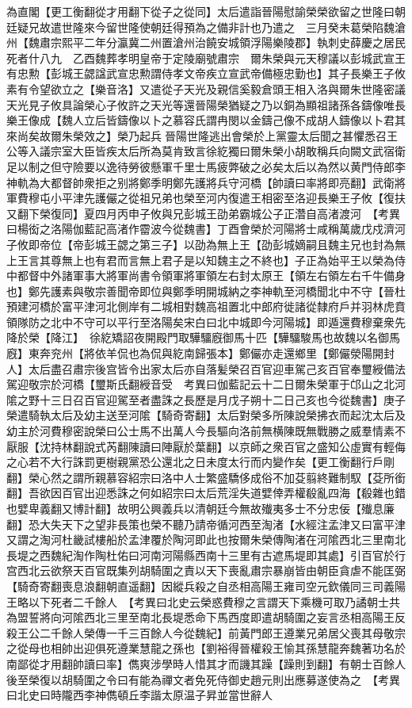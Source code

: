為直閣【更工衡翻從才用翻下從子之從同】太后遣詣晉陽慰諭榮榮欲留之世隆曰朝廷疑兄故遣世隆來今留世隆使朝廷得預為之備非計也乃遣之　三月癸未葛榮陷魏滄州【魏肅宗熙平二年分瀛冀二州置滄州治饒安城領浮陽樂陵郡】執刺史薛慶之居民死者什八九　乙酉魏葬孝明皇帝于定陵廟號肅宗　爾朱榮與元天穆議以彭城武宣王有忠勲【彭城王勰諡武宣忠勲謂侍孝文帝疾立宣武帝備極忠勤也】其子長樂王子攸素有令望欲立之【樂音洛】又遣從子天光及親信奚毅倉頭王相入洛與爾朱世隆密議天光見子攸具論榮心子攸許之天光等還晉陽榮猶疑之乃以銅為顯祖諸孫各鑄像唯長樂王像成【魏人立后皆鑄像以卜之慕容氏謂冉閔以金鑄己像不成胡人鑄像以卜君其來尚矣故爾朱榮效之】榮乃起兵晉陽世隆逃出會榮於上黨靈太后聞之甚懼悉召王公等入議宗室大臣皆疾太后所為莫肯致言徐紇獨曰爾朱榮小胡敢稱兵向闕文武宿衛足以制之但守險要以逸待勞彼懸軍千里士馬疲弊破之必矣太后以為然以黄門侍郎李神軌為大都督帥衆拒之别將鄭季明鄭先護將兵守河橋【帥讀曰率將即亮翻】武衛將軍費穆屯小平津先護儼之從祖兄弟也榮至河内復遣王相密至洛迎長樂王子攸【復扶又翻下榮復同】夏四月丙申子攸與兄彭城王劭弟霸城公子正濳自高渚渡河　【考異曰楊衒之洛陽伽藍記高渚作霤波今從魏書】丁酉會榮於河陽將士咸稱萬歲戊戍濟河子攸即帝位【帝彭城王勰之第三子】以劭為無上王【劭彭城嫡嗣且魏主兄也封為無上王言其尊無上也有君而言無上君子是以知魏主之不終也】子正為始平王以榮為侍中都督中外諸軍事大將軍尚書令領軍將軍領左右封太原王【領左右領左右千牛備身也】鄭先護素與敬宗善聞帝即位與鄭季明開城納之李神軌至河橋聞北中不守【晉杜預建河橋於富平津河北側岸有二城相對魏高祖置北中郎府徙諸從隸府戶并羽林虎賁領隊防之北中不守可以平行至洛陽矣宋白曰北中城即今河陽城】即遁還費穆棄衆先降於榮【降江】　徐紇矯詔夜開殿門取驊驑廐御馬十匹【驊驑駿馬也故魏以名御馬廐】東奔兖州【將依羊侃也為侃與紇南歸張本】鄭儼亦走還鄉里【鄭儼滎陽開封人】太后盡召肅宗後宫皆令出家太后亦自落髪榮召百官迎車駕己亥百官奉璽綬備法駕迎敬宗於河橋【璽斯氏翻綬音受　考異曰伽藍記云十二日爾朱榮軍于邙山之北河隂之野十三日召百官迎駕至者盡誅之長歷是月戊子朔十二日己亥也今從魏書】庚子榮遣騎執太后及幼主送至河隂【騎奇寄翻】太后對榮多所陳說榮拂衣而起沈太后及幼主於河費穆密說榮曰公士馬不出萬人今長驅向洛前無横陳既無戰勝之威羣情素不厭服【沈持林翻說式芮翻陳讀曰陣厭於葉翻】以京師之衆百官之盛知公虛實有輕侮之心若不大行誅罰更樹親黨恐公還北之日未度太行而内變作矣【更工衡翻行戶剛翻】榮心然之謂所親慕容紹宗曰洛中人士繁盛驕侈成俗不加芟翦終難制馭【芟所銜翻】吾欲因百官出迎悉誅之何如紹宗曰太后荒淫失道嬖倖弄權殽亂四海【殽雜也錯也嬖卑義翻又博計翻】故明公興義兵以清朝廷今無故殱夷多士不分忠佞【殱息廉翻】恐大失天下之望非長策也榮不聽乃請帝循河西至淘渚【水經注孟津又曰富平津又謂之淘河杜畿試樓船於孟津覆於陶河即此也按爾朱榮傳陶渚在河隂西北三里南北長堤之西魏紀淘作陶杜佑曰河南河陽縣西南十三里有古遮馬堤即其處】引百官於行宫西北云欲祭天百官既集列胡騎圍之責以天下喪亂肅宗暴崩皆由朝臣貪虐不能匡弼【騎奇寄翻喪息浪翻朝直遥翻】因縱兵殺之自丞相高陽王雍司空元欽儀同三司義陽王略以下死者二千餘人　【考異曰北史云榮惑費穆之言謂天下乘機可取乃譎朝士共為盟誓將向河隂西北三里至南北長堤悉命下馬西度即遣胡騎圍之妄言丞相高陽王反殺王公二千餘人榮傳一千三百餘人今從魏紀】前黃門郎王遵業兄弟居父喪其母敬宗之從母也相帥出迎俱死遵業慧龍之孫也【劉裕得晉權殺王愉其孫慧龍奔魏著功名於南鄙從才用翻帥讀曰率】儁爽涉學時人惜其才而譏其躁【躁則到翻】有朝士百餘人後至榮復以胡騎圍之令曰有能為禪文者免死侍御史趙元則出應募遂使為之　【考異曰北史曰時隴西李神儁頓丘李諧太原温子昇並當世辭人